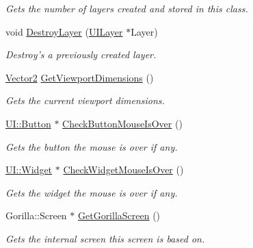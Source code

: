 \begin{DoxyCompactItemize}
\begin{DoxyCompactList}\small\item\em Gets the number of layers created and stored in this class. \item\end{DoxyCompactList}\item 
void \hyperlink{classphys_1_1UIScreen_ac1d9dfc0b8d9b3720f1447dcc93d8b55}{DestroyLayer} (\hyperlink{classphys_1_1UILayer}{UILayer} $\ast$Layer)
\begin{DoxyCompactList}\small\item\em Destroy's a previously created layer. \item\end{DoxyCompactList}\item 
\hyperlink{classphys_1_1Vector2}{Vector2} \hyperlink{classphys_1_1UIScreen_a588a4da7416bbbc0d96bc872c22d76bd}{GetViewportDimensions} ()
\begin{DoxyCompactList}\small\item\em Gets the current viewport dimensions. \item\end{DoxyCompactList}\item 
\hyperlink{classphys_1_1UI_1_1Button}{UI::Button} $\ast$ \hyperlink{classphys_1_1UIScreen_a7bc1a10b2172ad8885901de1a65a819d}{CheckButtonMouseIsOver} ()
\begin{DoxyCompactList}\small\item\em Gets the button the mouse is over if any. \item\end{DoxyCompactList}\item 
\hyperlink{classphys_1_1UI_1_1Widget}{UI::Widget} $\ast$ \hyperlink{classphys_1_1UIScreen_a00befef8c7bce9e8d149e6ba03419a53}{CheckWidgetMouseIsOver} ()
\begin{DoxyCompactList}\small\item\em Gets the widget the mouse is over if any. \item\end{DoxyCompactList}\item 
Gorilla::Screen $\ast$ \hyperlink{classphys_1_1UIScreen_a1ec3a329f7864905e6dc387f469068df}{GetGorillaScreen} ()
\begin{DoxyCompactList}\small\item\em Gets the internal screen this screen is based on. \item\end{DoxyCompactList}\end{DoxyCompactItemize}
